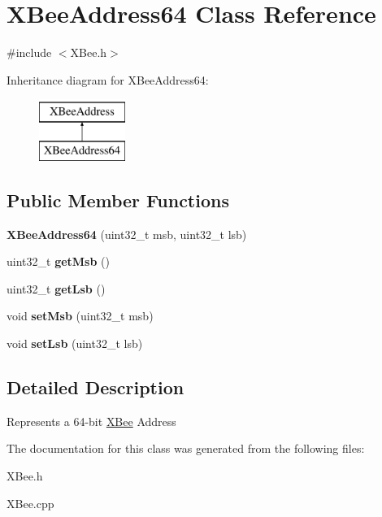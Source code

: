 \hypertarget{classXBeeAddress64}{\section{\-X\-Bee\-Address64 \-Class \-Reference}
\label{classXBeeAddress64}
}


{\ttfamily \#include $<$\-X\-Bee.\-h$>$}

\-Inheritance diagram for \-X\-Bee\-Address64\-:\begin{figure}[H]
\begin{center}
\leavevmode
\includegraphics[height=2.000000cm]{classXBeeAddress64}
\end{center}
\end{figure}
\subsection*{\-Public \-Member \-Functions}
\begin{DoxyCompactItemize}
\item 
\hypertarget{classXBeeAddress64_adfa0a20959a1f4255865e8412c668ad9}{{\bfseries \-X\-Bee\-Address64} (uint32\-\_\-t msb, uint32\-\_\-t lsb)}\label{classXBeeAddress64_adfa0a20959a1f4255865e8412c668ad9}

\item 
\hypertarget{classXBeeAddress64_a45b6fd6840c54b9b0c171043bc188010}{uint32\-\_\-t {\bfseries get\-Msb} ()}\label{classXBeeAddress64_a45b6fd6840c54b9b0c171043bc188010}

\item 
\hypertarget{classXBeeAddress64_aafc931f117f53cccbf21d70e9eb31d5c}{uint32\-\_\-t {\bfseries get\-Lsb} ()}\label{classXBeeAddress64_aafc931f117f53cccbf21d70e9eb31d5c}

\item 
\hypertarget{classXBeeAddress64_a35323c4cf8844715d0fc688ef0626352}{void {\bfseries set\-Msb} (uint32\-\_\-t msb)}\label{classXBeeAddress64_a35323c4cf8844715d0fc688ef0626352}

\item 
\hypertarget{classXBeeAddress64_a99a11e8801c87076ec816adeecf087ee}{void {\bfseries set\-Lsb} (uint32\-\_\-t lsb)}\label{classXBeeAddress64_a99a11e8801c87076ec816adeecf087ee}

\end{DoxyCompactItemize}


\subsection{\-Detailed \-Description}
\-Represents a 64-\/bit \hyperlink{classXBee}{\-X\-Bee} \-Address 

\-The documentation for this class was generated from the following files\-:\begin{DoxyCompactItemize}
\item 
\-X\-Bee.\-h\item 
\-X\-Bee.\-cpp\end{DoxyCompactItemize}
